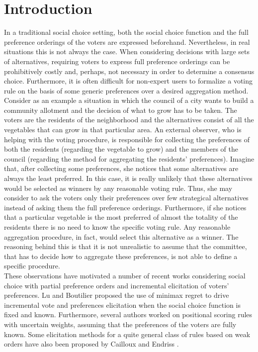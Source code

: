 \documentclass[a4paper,twoside]{article}
\begin{document}
\section{Introduction}
In a traditional social choice setting, both the social choice function and the full preference orderings of the voters are expressed beforehand. Nevertheless, in real situations this is not always the case. When considering decisions with large sets of alternatives, requiring voters to express full preference orderings can be prohibitively costly and, perhaps, not necessary in order to determine a consensus choice. Furthermore, it is often difficult for non-expert users to formalize a voting rule on the basis of some generic preferences over a desired aggregation method. Consider as an example a situation in which the council of a city wants to build a community allotment and the decision of what to grow has to be taken. The voters are the residents of the neighborhood and the alternatives consist of all the vegetables that can grow in that particular area. An external observer, who is helping with the voting procedure, is responsible for collecting the preferences of both the residents (regarding the vegetable to grow) and the members of the council (regarding the method for aggregating the residents' preferences). Imagine that, after collecting some preferences, she notices that some alternatives are always the least preferred. In this case, it is really unlikely that these alternatives would be selected as winners by any reasonable voting rule. Thus, she may consider to ask the voters only their preferences over few strategical alternatives instead of asking them the full preference orderings. Furthermore, if she notices that a particular vegetable is the most preferred of almost the totality of the residents there is no need to know the specific voting rule. Any reasonable aggregation procedure, in fact, would select this alternative as a winner. The reasoning behind this is that it is not unrealistic to assume that the committee, that has to decide how to aggregate these preferences, is not able to define a specific procedure. \\
These observations have motivated a number of recent works considering social choice with partial preference orders \citep{Xia2008, Pini2009, Konczak05} and incremental elicitation \citep{Kalech2011, Naamani-Dery2015} of voters' preferences. Lu and Boutilier \cite{Lu2011} proposed the use of minimax regret to drive incremental vote and preferences elicitation when the social choice function is fixed and known. Furthermore, several authors \citep{Stein1994, Llamazares2013, Viappiani2018} worked on positional scoring rules with uncertain weights, assuming that the preferences of the voters are fully known. Some elicitation methods for a quite general class of rules based on weak orders have also been proposed by Cailloux and Endriss \citep{Cailloux2014}. \\
\end{document}
